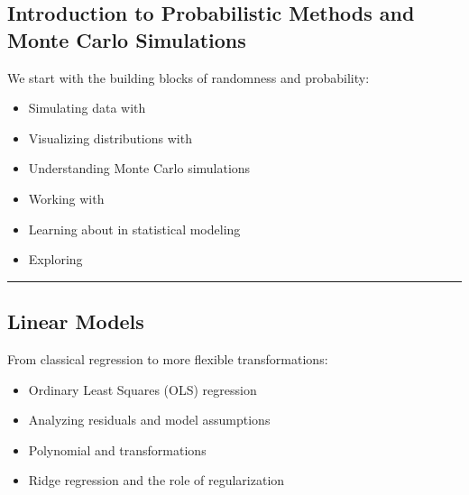 \documentclass[letterpaper,10pt,english]{jupyterBook}
\begin{document}
\subsection{Introduction to Probabilistic Methods and Monte Carlo Simulations}
\label{\detokenize{introduction:introduction-to-probabilistic-methods-and-monte-carlo-simulations}}
\sphinxAtStartPar
We start with the building blocks of randomness and probability:
\begin{itemize}
\item {} 
\sphinxAtStartPar
Simulating data with 

\item {} 
\sphinxAtStartPar
Visualizing distributions with 

\item {} 
\sphinxAtStartPar
Understanding Monte Carlo simulations

\item {} 
\sphinxAtStartPar
Working with 

\item {} 
\sphinxAtStartPar
Learning about  in statistical modeling

\item {} 
\sphinxAtStartPar
Exploring 

\end{itemize}


\bigskip\hrule\bigskip



\subsection{Linear Models}
\label{\detokenize{introduction:linear-models}}
\sphinxAtStartPar
From classical regression to more flexible transformations:
\begin{itemize}
\item {} 
\sphinxAtStartPar
Ordinary Least Squares (OLS) regression

\item {} 
\sphinxAtStartPar
Analyzing residuals and model assumptions

\item {} 
\sphinxAtStartPar
Polynomial and  transformations

\item {} 
\sphinxAtStartPar
Ridge regression and the role of regularization

\end{itemize}
\end{document}
